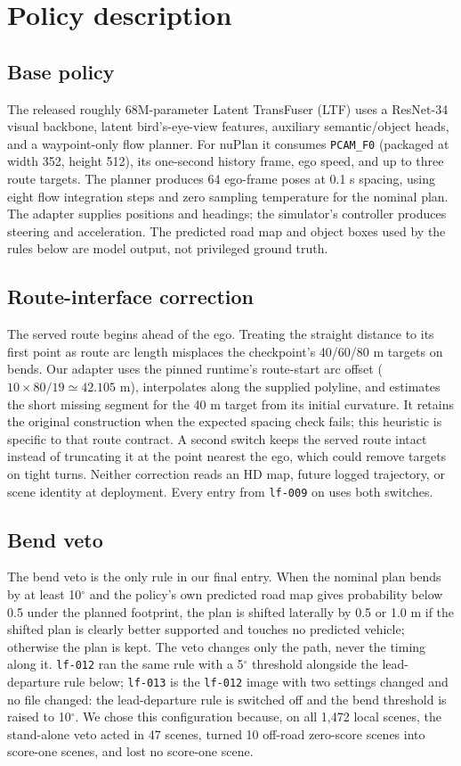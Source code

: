 \documentclass{article}
\newcommand{\lf}{\texttt{lf-009}}
\begin{document}
\section{Policy description}
\subsection{Base policy}\label{sec:base}
The released roughly 68M-parameter Latent TransFuser (LTF) \cite{transfuser} uses a ResNet-34 visual backbone, latent bird's-eye-view features, auxiliary semantic/object heads, and a waypoint-only flow planner. For nuPlan it consumes \texttt{PCAM\_F0} (packaged at width 352, height 512), its one-second history frame, ego speed, and up to three route targets. The planner produces 64 ego-frame poses at 0.1 s spacing, using eight flow integration steps and zero sampling temperature for the nominal plan. The adapter supplies positions and headings; the simulator's controller produces steering and acceleration. The predicted road map and object boxes used by the rules below are model output, not privileged ground truth.

\subsection{Route-interface correction}\label{sec:route}
The served route begins ahead of the ego. Treating the straight distance to its first point as route arc length misplaces the checkpoint's 40/60/80 m targets on bends. Our adapter uses the pinned runtime's route-start arc offset ($10\times80/19\simeq42.105$ m), interpolates along the supplied polyline, and estimates the short missing segment for the 40 m target from its initial curvature. It retains the original construction when the expected spacing check fails; this heuristic is specific to that route contract. A second switch keeps the served route intact instead of truncating it at the point nearest the ego, which could remove targets on tight turns. Neither correction reads an HD map, future logged trajectory, or scene identity at deployment. Every entry from \lf{} on uses both switches.

\subsection{Bend veto}\label{sec:veto}
The bend veto is the only rule in our final entry. When the nominal plan bends by at least 10$^\circ$ and the policy's own predicted road map gives probability below 0.5 under the planned footprint, the plan is shifted laterally by 0.5 or 1.0 m if the shifted plan is clearly better supported and touches no predicted vehicle; otherwise the plan is kept. The veto changes only the path, never the timing along it. \texttt{lf-012} ran the same rule with a 5$^\circ$ threshold alongside the lead-departure rule below; \texttt{lf-013} is the \texttt{lf-012} image with two settings changed and no file changed: the lead-departure rule is switched off and the bend threshold is raised to 10$^\circ$. We chose this configuration because, on all 1,472 local scenes, the stand-alone veto acted in 47 scenes, turned 10 off-road zero-score scenes into score-one scenes, and lost no score-one scene.
\end{document}

